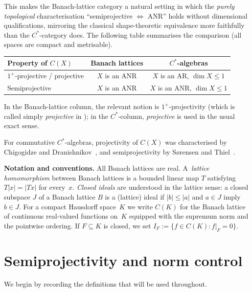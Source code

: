 \documentclass[11pt]{amsart}
\renewcommand{\le}{\leqslant}
\numberwithin{equation}{section}
\theoremstyle{definition}
\theoremstyle{remark}
\theoremstyle{plain}
\begin{document}
This makes the Banach-lattice category a natural setting in which
the \emph{purely topological} characterisation
``semiprojective $\Longleftrightarrow$ ANR'' holds without dimensional qualifications,
mirroring the classical shape-theoretic equivalence more faithfully
than the $C^*$-category does.
The following table summarises the comparison (all spaces are compact and metrisable).

\medskip
\begin{center}
\renewcommand{\arraystretch}{1.3}
\begin{tabular}{lcc}
\hline
\textbf{Property of $C(X)$} & \textbf{Banach lattices} & \textbf{$C^*$-algebras}\\
\hline
$1^+$-projective / projective & $X$ is an ANR & $X$ is an AR, $\dim X\le 1$ \\
Semiprojective & $X$ is an ANR & $X$ is an ANR, $\dim X\le 1$ \\
\hline
\end{tabular}
\end{center}
In the Banach-lattice column, the relevant notion is \(1^+\)-projectivity
(which is called simply \emph{projective} in \cite{dpw});
in the \(C^*\)-column, \emph{projective} is used in the usual exact sense.

For commutative $C^*$-algebras, projectivity of $C(X)$
was characterised by Chigogidze and Dranishnikov~\cite{chigogidze-dranishnikov},
and semiprojectivity by S\o rensen and Thiel~\cite{sorensen-thiel}.

\medskip

\noindent\textbf{Notation and conventions.}
All Banach lattices are real.
A~\emph{lattice homomorphism} between Banach lattices
is a bounded linear map $T$ satisfying $T|x|=|Tx|$ for every~$x$.
\emph{Closed ideals} are understood in the lattice sense:
a closed subspace $J$ of a Banach lattice $B$ is a (lattice) ideal
if $|b|\le |a|$ and $a\in J$ imply $b\in J$.
For a compact Hausdorff space~$K$ we write $C(K)$
for the Banach lattice of continuous real-valued functions on~$K$
equipped with the supremum norm and the pointwise ordering.
If $F\subseteq K$ is closed, we set $I_F:=\{f\in C(K): f|_F=0\}$.

\section{Semiprojectivity and norm control}\label{sec:semi}

We begin by recording the definitions that will be used throughout.
\end{document}
